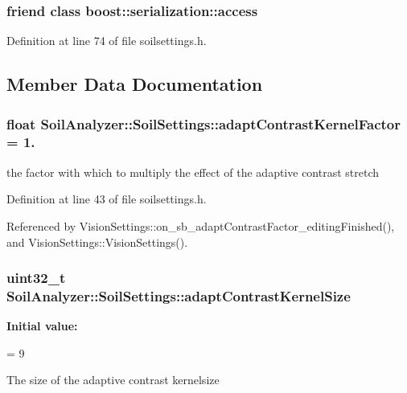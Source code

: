 \subsubsection[{boost\+::serialization\+::access}]{\setlength{\rightskip}{0pt plus 5cm}friend class boost\+::serialization\+::access\hspace{0.3cm}{\ttfamily [friend]}}\label{class_soil_analyzer_1_1_soil_settings_ac98d07dd8f7b70e16ccb9a01abf56b9c}


Definition at line 74 of file soilsettings.\+h.



\subsection{Member Data Documentation}
\hypertarget{class_soil_analyzer_1_1_soil_settings_ace12c0f4bc35d420ef528cc390fc2cdb}{}
\subsubsection[{adapt\+Contrast\+Kernel\+Factor}]{\setlength{\rightskip}{0pt plus 5cm}float Soil\+Analyzer\+::\+Soil\+Settings\+::adapt\+Contrast\+Kernel\+Factor = 1.}\label{class_soil_analyzer_1_1_soil_settings_ace12c0f4bc35d420ef528cc390fc2cdb}
the factor with which to multiply the effect of the adaptive contrast stretch 

Definition at line 43 of file soilsettings.\+h.



Referenced by Vision\+Settings\+::on\+\_\+sb\+\_\+adapt\+Contrast\+Factor\+\_\+editing\+Finished(), and Vision\+Settings\+::\+Vision\+Settings().

\hypertarget{class_soil_analyzer_1_1_soil_settings_a73f627b092dbdbda37b66ef6c2eef95c}{}
\subsubsection[{adapt\+Contrast\+Kernel\+Size}]{\setlength{\rightskip}{0pt plus 5cm}uint32\+\_\+t Soil\+Analyzer\+::\+Soil\+Settings\+::adapt\+Contrast\+Kernel\+Size}\label{class_soil_analyzer_1_1_soil_settings_a73f627b092dbdbda37b66ef6c2eef95c}
{\bfseries Initial value\+:}
\begin{DoxyCode}
=
      9
\end{DoxyCode}
The size of the adaptive contrast kernelsize 

